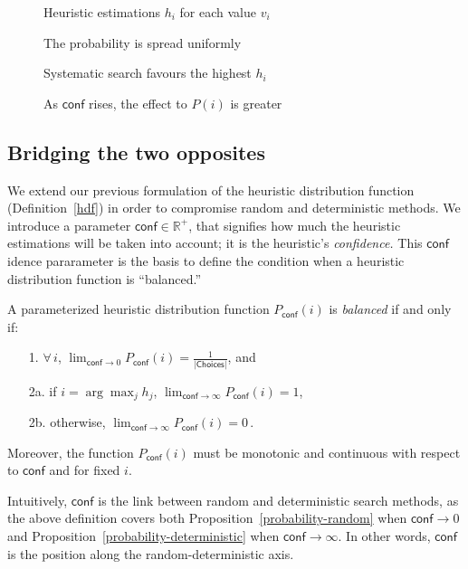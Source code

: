 \documentclass{ws-ijait}
\begin{document}
\begin{figure}
  \centering
  
  \caption{Heuristic estimations $h_i$ for each value
           $v_i$\label{heuristics}}
\end{figure}

\begin{figure}
  \centering
  
  \caption{The probability is spread
           uniformly\label{uniform}}
\end{figure}

\begin{figure}
  \centering
  
  \caption{Systematic search favours the highest
           $h_i$\label{systematic}}
\end{figure}

\begin{figure}
  \centering
  
  \caption{As $\mathsf{conf}$ rises, the effect to $P(i)$ is
           greater\label{conf}}
\end{figure}

\subsection{Bridging the two opposites}

We extend our previous formulation of the heuristic
distribution function (Definition~\ref{hdf}) in order to
compromise random and deterministic methods. We introduce a
parameter $\mathsf{conf} \in \mathbb{R}^+$, that signifies
how much the heuristic estimations will be taken into
account; it is the heuristic's \emph{confidence.} This
$\mathsf{conf}$idence pararameter is the basis to define the
condition when a heuristic distribution function is
``balanced.''
\begin{definition}
  \label{balanced}
  A parameterized heuristic distribution function
  $P_\mathsf{conf} (i)$ is \emph{balanced} if and only if:
  \begin{enumerate}
    \item[1.] $\forall \, i$, ${\displaystyle
              \lim_{\mathsf{conf} \to 0} } \!\!
              P_\mathsf{conf} (i) =
              \frac{1}{|\mathsf{Choices}|}$, and
    \item[2a.] if $i = \arg\max_j h_j$, ${\displaystyle
               \lim_{\mathsf{conf} \to \infty} } \!\!\!\!
               P_\mathsf{conf} (i) = 1$,
    \item[2b.] otherwise, ${\displaystyle
               \lim_{\mathsf{conf} \to \infty} } \!\!\!\!
               P_\mathsf{conf} (i) = 0 \,$.
  \end{enumerate}
  Moreover, the function $P_\mathsf{conf} (i)$ must be
  monotonic and continuous with respect to $\mathsf{conf}$
  and for fixed $i$.
\end{definition}
Intuitively, $\mathsf{conf}$ is the link between random and
deterministic search methods, as the above definition covers
both Proposition~\ref{probability-random} when
$\mathsf{conf} \to 0$ and
Proposition~\ref{probability-deterministic} when
$\mathsf{conf} \to \infty$. In other words, $\mathsf{conf}$
is the position along the random-deterministic axis.
\end{document}
